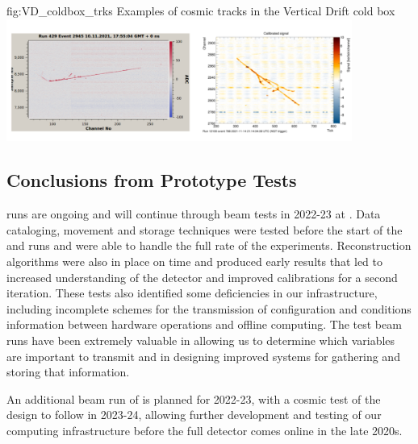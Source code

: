 \documentclass[../main-v1.tex]{subfiles}
\begin{document}
\begin{dunefigure}
{fig:VD_coldbox_trks}
{Examples of cosmic tracks in the Vertical Drift cold box}
\includegraphics[width=0.85\textwidth]{graphics/IntroFigures/Fig_14_VD_coldbox.png}
\end{dunefigure}


\subsection{Conclusions from Prototype Tests }

runs are ongoing and will continue through beam tests in 2022-23 at .  Data cataloging, movement and storage techniques were tested before the start of the  and   runs and were able to handle the full rate of the experiments.   Reconstruction algorithms were also in place on time and %
produced early results that led to increased understanding of the detector and improved calibrations for a second iteration.  These tests also identified some deficiencies in our infrastructure, including incomplete schemes for the transmission of configuration and conditions information between hardware operations and  offline computing.  The test beam runs have been extremely valuable in allowing us to determine which variables are important to transmit and in designing improved systems for gathering and storing that information. 

An additional beam run of   is planned for 2022-23, with a cosmic test of the  design to follow in 2023-24, allowing further development and testing of our computing infrastructure before the full detector comes online in the late 2020s. 

\end{document}
